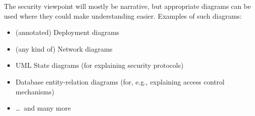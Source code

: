 The security viewpoint will mostly be narrative, but appropriate diagrams can be
used where they could make understanding easier. Examples of such diagrams:

\begin{itemize}
\item (annotated) Deployment diagrams
\item (any kind of) Network diagrams
\item UML State diagrams (for explaining security protocols)
\item Database entity-relation diagrams (for, e.g., explaining access control mechanisms)
\item \ldots\ and many more
\end{itemize}